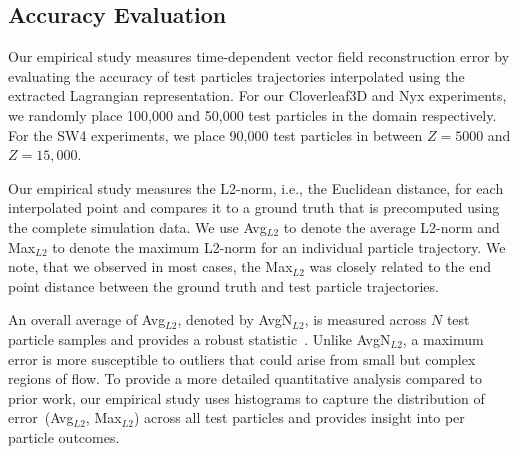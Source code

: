 \subsection{Accuracy Evaluation}
\label{sec:evaluation}
Our empirical study measures time-dependent vector field reconstruction error by evaluating the accuracy of test particles trajectories interpolated using the extracted Lagrangian representation.
%
For our Cloverleaf3D and Nyx experiments, we randomly place 100,000 and 50,000 test particles in the domain respectively.
%
For the SW4 experiments, we place 90,000 test particles in between $Z=5000$ and $Z=15,000$.
%

Our empirical study measures the L2-norm, i.e., the Euclidean distance, for each interpolated point and compares it to a ground truth that is precomputed using the complete simulation data. 
%
We use Avg$_{L2}$ to denote the average L2-norm and Max$_{L2}$ to denote the maximum L2-norm for an individual particle trajectory.
%
We note, that we observed in most cases, the Max$_{L2}$ was closely related to the end point distance between the ground truth and test particle trajectories.
%

An overall average of Avg$_{L2}$, denoted by AvgN$_{L2}$, is measured across $N$ test particle samples and provides a robust statistic~\cite{agranovsky2014improved, sane2018revisiting, sane2019interpolation, rapp2019void}.
%
Unlike AvgN$_{L2}$, a maximum error is more susceptible to outliers that could arise from small but complex regions of flow.
%
To provide a more detailed quantitative analysis compared to prior work, our empirical study uses histograms to capture the distribution of error~(Avg$_{L2}$, Max$_{L2}$) across all test particles and provides insight into per particle outcomes.  
